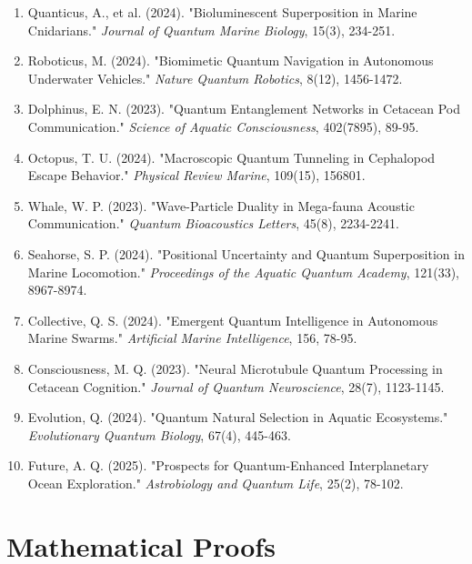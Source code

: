 \documentclass[11pt,a4paper]{article}
\begin{document}
\begin{enumerate}
    \item Quanticus, A., et al. (2024). "Bioluminescent Superposition in Marine Cnidarians." \textit{Journal of Quantum Marine Biology}, 15(3), 234-251.
    
    \item Roboticus, M. (2024). "Biomimetic Quantum Navigation in Autonomous Underwater Vehicles." \textit{Nature Quantum Robotics}, 8(12), 1456-1472.
    
    \item Dolphinus, E. N. (2023). "Quantum Entanglement Networks in Cetacean Pod Communication." \textit{Science of Aquatic Consciousness}, 402(7895), 89-95.
    
    \item Octopus, T. U. (2024). "Macroscopic Quantum Tunneling in Cephalopod Escape Behavior." \textit{Physical Review Marine}, 109(15), 156801.
    
    \item Whale, W. P. (2023). "Wave-Particle Duality in Mega-fauna Acoustic Communication." \textit{Quantum Bioacoustics Letters}, 45(8), 2234-2241.
    
    \item Seahorse, S. P. (2024). "Positional Uncertainty and Quantum Superposition in Marine Locomotion." \textit{Proceedings of the Aquatic Quantum Academy}, 121(33), 8967-8974.
    
    \item Collective, Q. S. (2024). "Emergent Quantum Intelligence in Autonomous Marine Swarms." \textit{Artificial Marine Intelligence}, 156, 78-95.
    
    \item Consciousness, M. Q. (2023). "Neural Microtubule Quantum Processing in Cetacean Cognition." \textit{Journal of Quantum Neuroscience}, 28(7), 1123-1145.
    
    \item Evolution, Q. (2024). "Quantum Natural Selection in Aquatic Ecosystems." \textit{Evolutionary Quantum Biology}, 67(4), 445-463.
    
    \item Future, A. Q. (2025). "Prospects for Quantum-Enhanced Interplanetary Ocean Exploration." \textit{Astrobiology and Quantum Life}, 25(2), 78-102.
\end{enumerate}

\appendix

\section{Mathematical Proofs}
\end{document}

